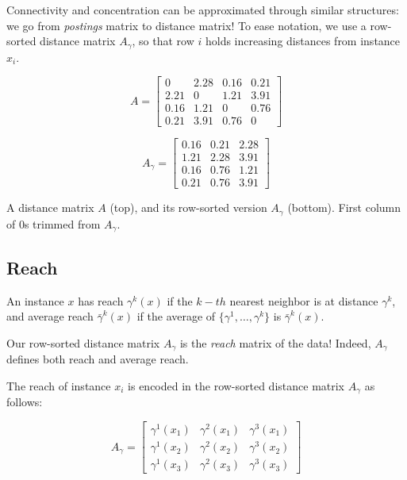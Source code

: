 \begin{paracol}{2}
   
   \colfill
   Connectivity and concentration can be
   approximated through similar
   structures: we go from \textit{postings} matrix to
   distance matrix!
   To ease notation, we use a row-sorted
   distance matrix $A_{\gamma}$, so that row $i$ holds
   increasing distances from instance $x_i$.
   \colfill

   \switchcolumn

   \[
   A = \begin{bmatrix}
   0 & 2.28 & 0.16 & 0.21 \\
   2.21 & 0 & 1.21 & 3.91 \\
   0.16 & 1.21 & 0 & 0.76 \\
   0.21 & 3.91 & 0.76 & 0
   \end{bmatrix}
   \]
   
   \[
   A_{\gamma} = \begin{bmatrix}
   0.16 & 0.21 & 2.28 \\
   1.21 & 2.28 & 3.91 \\
   0.16 & 0.76 & 1.21 \\
   0.21 & 0.76 & 3.91
   \end{bmatrix}
   \]
   
   A distance matrix $A$ (top), and its row-sorted version $A_{\gamma}$ (bottom). First column of 0s trimmed from $A_{\gamma}$.
\end{paracol}


\subsection{Reach}
An instance $x$ has reach $\gamma^k(x)$ if the $k-th$ nearest neighbor is at distance $\gamma^k$, and average reach $\bar{\gamma}^k(x)$ if the average of $\{\gamma^1, \ldots, \gamma^k\}$ is $\bar{\gamma}^k(x)$.

Our row-sorted distance matrix $A_{\gamma}$ is the \textit{reach} matrix of the data! Indeed, $A_{\gamma}$ defines both reach and average reach.
\nl

The reach of instance $x_i$ is encoded in the row-sorted distance matrix $A_{\gamma}$ as follows:

\[
A_{\gamma} = \begin{bmatrix}
\gamma^1(x_1) & \gamma^2(x_1) & \gamma^3(x_1) \\
\gamma^1(x_2) & \gamma^2(x_2) & \gamma^3(x_2) \\
\gamma^1(x_3) & \gamma^2(x_3) & \gamma^3(x_3)
\end{bmatrix}
\]

